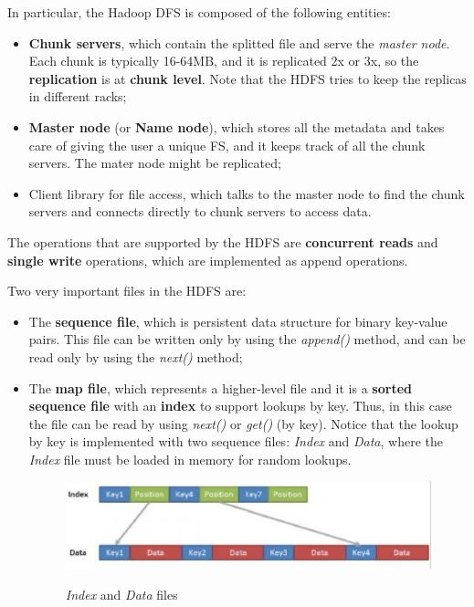 In particular, the Hadoop DFS is composed of the following entities:

\begin{itemize}
    \item \textbf{Chunk servers}, which contain the splitted file and serve the \textit{master node}. Each chunk is typically 16-64MB, and it is replicated 2x or 3x, so the \textbf{replication} is at \textbf{chunk level}. Note that the HDFS tries to keep the replicas in different racks;
    \item \textbf{Master node} (or \textbf{Name node}), which stores all the metadata and takes care of giving the user a unique FS, and it keeps track of all the chunk servers. The mater node might be replicated;
    \item Client library for file access, which talks to the master node to find the chunk servers and connects directly to chunk servers to access data.
\end{itemize}

The operations that are supported by the HDFS are \textbf{concurrent reads} and \textbf{single write} operations, which are implemented as append operations.

Two very important files in the HDFS are:

\begin{itemize}
    \item The \textbf{sequence file}, which is persistent data structure for binary key-value pairs. This file can be written only by using the \textit{append()} method, and can be read only by using the \textit{next()} method;
    \item The \textbf{map file}, which represents a higher-level file and it is a \textbf{sorted sequence file} with an \textbf{index} to support lookups by key. Thus, in this case the file can be read by using \textit{next()} or \textit{get()} (by key). Notice that the lookup by key is implemented with two sequence files: \textit{Index} and \textit{Data}, where the \textit{Index} file must be loaded in memory for random lookups.

    \begin{figure}[h!]
		\centering
		\includegraphics[scale = 2.0]{img/index map file.jpg}
        \label{sequence map files}
        \caption{\textit{Index} and \textit{Data} files}
    \end{figure}
\end{itemize}


